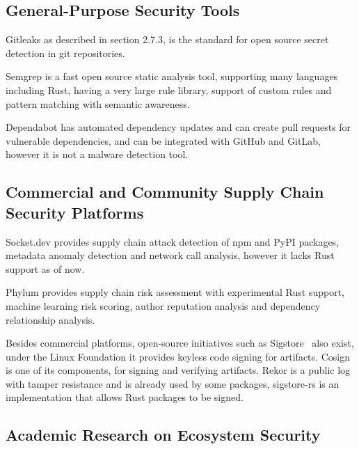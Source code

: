 

\subsection{General-Purpose Security Tools}\label{sect:general-purpose-security-tools}

Gitleaks as described in section 2.7.3, is the standard for open source secret detection in git repositories.

Semgrep is a fast open source static analysis tool, supporting many languages including Rust, having a very large rule library, support of custom rules and pattern matching with semantic awareness.

Dependabot has automated dependency updates and can create pull requests for vulnerable dependencies, and can be integrated with GitHub and GitLab, however it is not a malware detection tool.

\subsection{Commercial and Community Supply Chain Security Platforms}\label{sect:commercial-community-supply-chain-security-platforms}

Socket.dev provides supply chain attack detection of npm and PyPI packages, metadata anomaly detection and network call analysis, however it lacks Rust support as of now.

Phylum provides supply chain risk assessment with experimental Rust support, machine learning risk scoring, author reputation analysis and dependency relationship analysis.

Besides commercial platforms, open-source initiatives such as Sigstore~\cite{sigstore2024} also exist, under the Linux Foundation it provides keyless code signing for artifacts.
Cosign is one of its components, for signing and verifying artifacts. Rekor is a public log with tamper resistance and is already used by some packages, sigstore-rs is an implementation that allows Rust packages to be signed.

\subsection{Academic Research on Ecosystem Security}\label{sect:academic-research-ecosystem-security}

